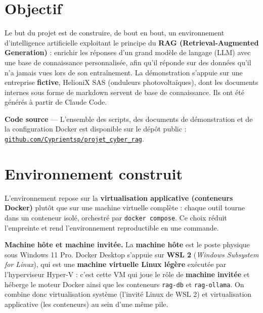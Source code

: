 \documentclass[11pt,a4paper]{article}
\newcommand{\projeturl}{https://github.com/Cyprientsp/projet_cyber_rag}
\begin{document}
\section{Objectif}
Le but du projet est de construire, de bout en bout, un environnement d'intelligence
artificielle exploitant le principe du \textbf{RAG (Retrieval-Augmented Generation)} :
enrichir les réponses d'un grand modèle de langage (LLM) avec une base de connaissance
personnalisée, afin qu'il réponde sur des données qu'il n'a jamais vues lors de son
entraînement. La démonstration s'appuie sur une entreprise \textbf{fictive}, HelioniX
SAS (onduleurs photovoltaïques), dont les documents internes sous forme de markdown
servent de base de connaissance. Ils ont été générés à partir de Claude Code.

\medskip
\noindent\textbf{Code source} --- L'ensemble des scripts, des documents de démonstration
et de la configuration Docker est disponible sur le dépôt public :
\href{\projeturl}{\texttt{\color{accent}github.com/Cyprientsp/projet\_cyber\_rag}}.

\section{Environnement construit}
L'environnement repose sur la \textbf{virtualisation applicative (conteneurs Docker)}
plutôt que sur une machine virtuelle complète : chaque outil tourne dans un conteneur
isolé, orchestré par \texttt{docker compose}. Ce choix réduit l'empreinte et rend
l'environnement reproductible en une commande.

\medskip
\noindent\textbf{Machine hôte et machine invitée.} La \textbf{machine hôte} est le poste
physique sous Windows 11 Pro. Docker Desktop s'appuie sur \textbf{WSL 2}
(\textit{Windows Subsystem for Linux}), qui est une \textbf{machine virtuelle Linux
légère} exécutée par l'hyperviseur Hyper-V : c'est cette VM qui joue le rôle de
\textbf{machine invitée} et héberge le moteur Docker ainsi que les conteneurs
\texttt{rag-db} et \texttt{rag-ollama}. On combine donc virtualisation système (l'invité
Linux de WSL 2) et virtualisation applicative (les conteneurs) au sein d'une même pile.
\end{document}
